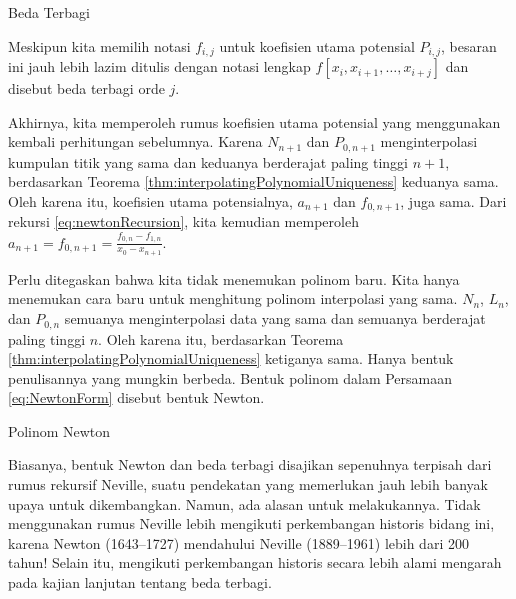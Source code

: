\noindent\begin{digression}{Beda Terbagi}

\noindent Meskipun kita memilih notasi $f_{i,j}$ untuk koefisien
utama potensial $P_{i,j}$, besaran ini jauh lebih lazim ditulis dengan
notasi lengkap $f[x_{i},x_{i+1},\ldots,x_{i+j}]$ dan disebut beda
terbagi orde $j$.

\noindent\end{digression}

Akhirnya, kita memperoleh rumus koefisien utama potensial yang menggunakan
kembali perhitungan sebelumnya. Karena $N_{n+1}$ dan $P_{0,n+1}$
menginterpolasi kumpulan titik yang sama dan keduanya berderajat paling
tinggi $n+1$, berdasarkan Teorema \ref{thm:interpolatingPolynomialUniqueness}
keduanya sama. Oleh karena itu, koefisien utama potensialnya, $a_{n+1}$
dan $f_{0,n+1}$, juga sama. Dari rekursi \ref{eq:newtonRecursion},
kita kemudian memperoleh $a_{n+1}=f_{0,n+1}=\frac{f_{0,n}-f_{1,n}}{x_{0}-x_{n+1}}$.

Perlu ditegaskan bahwa kita tidak menemukan polinom baru. Kita hanya
menemukan cara baru untuk menghitung polinom interpolasi yang sama.
$N_{n}$, $L_{n}$, dan $P_{0,n}$ semuanya menginterpolasi data yang
sama dan semuanya berderajat paling tinggi $n$. Oleh karena itu,
berdasarkan Teorema \ref{thm:interpolatingPolynomialUniqueness} ketiganya
sama. Hanya bentuk penulisannya yang mungkin berbeda. Bentuk polinom
dalam Persamaan \ref{eq:NewtonForm} disebut bentuk Newton.

\noindent\begin{digression}{Polinom Newton}

\noindent Biasanya, bentuk Newton  
dan beda terbagi disajikan sepenuhnya terpisah dari rumus rekursif
Neville, suatu pendekatan yang memerlukan jauh lebih banyak upaya
untuk dikembangkan. Namun, ada alasan untuk melakukannya. Tidak menggunakan
rumus Neville lebih mengikuti perkembangan historis bidang ini, karena
Newton (1643--1727) mendahului Neville (1889--1961) lebih dari 200
tahun! Selain itu, mengikuti perkembangan historis secara lebih alami
mengarah pada kajian lanjutan tentang beda terbagi.

\noindent\end{digression}

